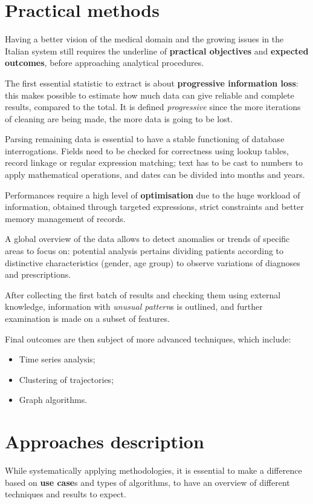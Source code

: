 \section{Practical methods}
Having a better vision of the medical domain and the growing issues in the Italian system still requires the underline of \textbf{practical objectives} and \textbf{expected outcomes}, before approaching analytical procedures.

The first essential statistic to extract is about \textbf{progressive information loss}: this makes possible to estimate how much data can give reliable and complete results, compared to the total. It is defined \textit{progressive} since the more iterations of cleaning are being made, the more data is going to be lost. 

Parsing remaining data is essential to have a stable functioning of database interrogations. Fields need to be checked for correctness using lookup tables, record linkage or regular expression matching; text has to be cast to numbers to apply mathematical operations, and dates can be divided into months and years.

Performances require a high level of \textbf{optimisation} due to the huge workload of information, obtained through targeted expressions, strict constraints and better memory management of records. 

A global overview of the data allows to detect anomalies or trends of specific areas to focus on: potential analysis pertains dividing patients according to distinctive characteristics (gender, age group) to observe variations of diagnoses and prescriptions. 

After collecting the first batch of results and checking them using external knowledge, information with \textit{unusual pattern}s is outlined, and further examination is made on a subset of features.

Final outcomes are then subject of more advanced techniques, which include:
\begin{itemize}
	\item Time series analysis;
	\item Clustering of trajectories;
	\item Graph algorithms.
\end{itemize}

\section{Approaches description}
While systematically applying methodologies, it is essential to make a difference based on \textbf{use case}s and types of algorithms, to have an overview of different techniques and results to expect.

